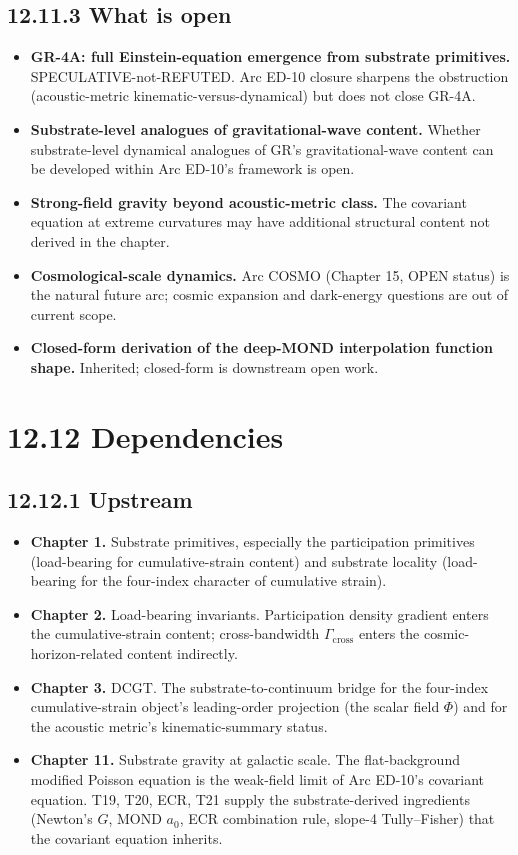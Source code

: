 \documentclass[11pt]{book}
\begin{document}
\subsection{12.11.3 What is open}

\begin{itemize}
\item \textbf{GR-4A: full Einstein-equation emergence from substrate primitives.} SPECULATIVE-not-REFUTED. Arc ED-10 closure sharpens the obstruction (acoustic-metric kinematic-versus-dynamical) but does not close GR-4A.
\item \textbf{Substrate-level analogues of gravitational-wave content.} Whether substrate-level dynamical analogues of GR's gravitational-wave content can be developed within Arc ED-10's framework is open.
\item \textbf{Strong-field gravity beyond acoustic-metric class.} The covariant equation at extreme curvatures may have additional structural content not derived in the chapter.
\item \textbf{Cosmological-scale dynamics.} Arc COSMO (Chapter 15, OPEN status) is the natural future arc; cosmic expansion and dark-energy questions are out of current scope.
\item \textbf{Closed-form derivation of the deep-MOND interpolation function shape.} Inherited; closed-form is downstream open work.
\end{itemize}

\section{12.12 Dependencies}

\subsection{12.12.1 Upstream}

\begin{itemize}
\item \textbf{Chapter 1.} Substrate primitives, especially the participation primitives (load-bearing for cumulative-strain content) and substrate locality (load-bearing for the four-index character of cumulative strain).
\item \textbf{Chapter 2.} Load-bearing invariants. Participation density gradient enters the cumulative-strain content; cross-bandwidth $\Gamma_\mathrm{cross}$ enters the cosmic-horizon-related content indirectly.
\item \textbf{Chapter 3.} DCGT. The substrate-to-continuum bridge for the four-index cumulative-strain object's leading-order projection (the scalar field $\Phi$) and for the acoustic metric's kinematic-summary status.
\item \textbf{Chapter 11.} Substrate gravity at galactic scale. The flat-background modified Poisson equation is the weak-field limit of Arc ED-10's covariant equation. T19, T20, ECR, T21 supply the substrate-derived ingredients (Newton's $G$, MOND $a_0$, ECR combination rule, slope-4 Tully–Fisher) that the covariant equation inherits.
\end{itemize}
\end{document}
